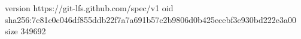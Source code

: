 version https://git-lfs.github.com/spec/v1
oid sha256:7c81c0c046df855ddb22f7a7a691b57c2b9806d0b425ecebf3e930bd222e3a00
size 349692
